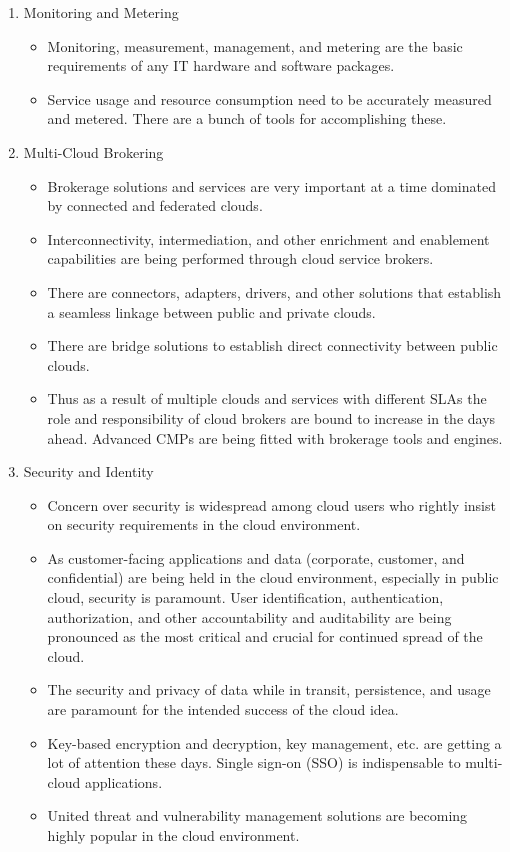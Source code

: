 \documentclass[a4paper, 12pt]{article}
\begin{document}
\begin{enumerate}
\item
Monitoring and Metering
\begin{itemize}
\item
Monitoring, measurement, management, and metering are the basic requirements of any IT hardware and software packages.
\item
Service usage and resource consumption need to be accurately measured and metered. There are a bunch of tools for accomplishing these.
\end{itemize}

\newpage
\item
Multi-Cloud Brokering
\begin{itemize}
\item
Brokerage solutions and services are very important at a time dominated by connected and federated clouds.
\item
Interconnectivity, intermediation, and other enrichment and enablement capabilities are being performed through cloud service brokers.
\item
There are connectors, adapters, drivers, and other solutions that establish a seamless linkage between public and private clouds.
\item
There are bridge solutions to establish direct connectivity between public clouds.
\item
Thus as a result of multiple clouds and services with different SLAs the role and responsibility of cloud brokers are bound to increase in the days ahead. Advanced CMPs are being fitted with brokerage tools and engines.
\end{itemize}

\item
Security and Identity
\begin{itemize}
\item
Concern over security is widespread among cloud users who rightly insist on security requirements in the cloud environment. 
\item
As customer-facing applications and data (corporate, customer, and confidential) are being held in the cloud environment, especially in public cloud, security is paramount. User identification, authentication, authorization, and other accountability and auditability are being pronounced as the most critical and crucial for continued spread of the cloud.
\item
The security and privacy of data while in transit, persistence, and usage are paramount for the intended success of the cloud idea.
\item
Key-based encryption and decryption, key management, etc. are getting a lot of attention these days. Single sign-on (SSO) is indispensable to multi-cloud applications.
\item
United threat and vulnerability management solutions are becoming highly popular in the cloud environment.
\end{itemize}


\end{enumerate}
\end{document}
